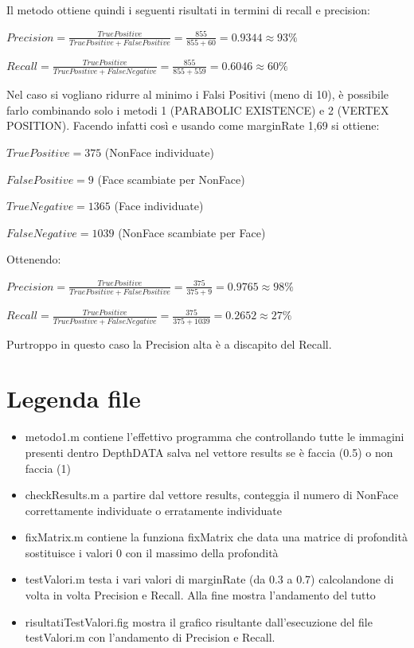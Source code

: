 \documentclass[
  italian,
]{article}
\providecommand{\tightlist}{%
  \setlength{\itemsep}{0pt}\setlength{\parskip}{0pt}}
\begin{document}
\bigskip
Il metodo ottiene quindi i seguenti risultati in termini di recall e
precision:

\(Precision = \frac{TruePositive}{TruePositive + FalsePositive} = \frac{855}{855+60} = 0.9344 \approx 93\%\)

\(Recall = \frac{TruePositive}{TruePositive + FalseNegative} = \frac{855}{855+559} = 0.6046 \approx 60\%\)

\pagebreak

Nel caso si vogliano ridurre al minimo i Falsi Positivi (meno di 10), è possibile farlo combinando solo i metodi 1 (PARABOLIC EXISTENCE) e 2 (VERTEX POSITION).
Facendo infatti così e usando come marginRate 1,69 si ottiene:

\(True Positive = 375\) (NonFace individuate)

\(False Positive = 9\) (Face scambiate per NonFace)

\(True Negative = 1365\) (Face individuate)

\(False Negative = 1039\) (NonFace scambiate per Face)

Ottenendo:

\(Precision = \frac{TruePositive}{TruePositive + FalsePositive} = \frac{375}{375+9} = 0.9765 \approx 98\%\)

\(Recall = \frac{TruePositive}{TruePositive + FalseNegative} = \frac{375}{375+1039} = 0.2652 \approx 27\%\)

Purtroppo in questo caso la Precision alta è a discapito del Recall.



\hypertarget{legenda-file}{%
\section{Legenda file}\label{legenda-file}}

\begin{itemize}
\tightlist
\item
  metodo1.m contiene l'effettivo programma che controllando tutte le
  immagini presenti dentro DepthDATA salva nel vettore results se è
  faccia (0.5) o non faccia (1)
\item
  checkResults.m a partire dal vettore results, conteggia il numero di
  NonFace correttamente individuate o erratamente individuate
\item
  fixMatrix.m contiene la funziona fixMatrix che data una matrice di
  profondità sostituisce i valori 0 con il massimo della profondità
\item
  testValori.m testa i vari valori di marginRate (da 0.3 a 0.7)
  calcolandone di volta in volta Precision e Recall. Alla fine mostra
  l'andamento del tutto
\item
  risultatiTestValori.fig mostra il grafico risultante dall'esecuzione
  del file testValori.m con l'andamento di Precision e Recall.
\end{itemize}
\end{document}
